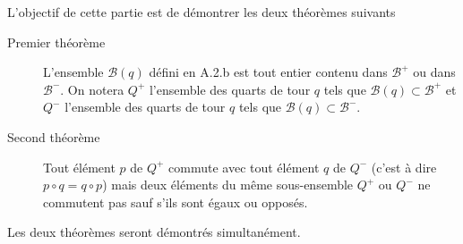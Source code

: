 L'objectif de cette partie est de démontrer les deux théorèmes suivants
\begin{description}
\item[Premier théorème] L'ensemble $\mathcal{B}(q)$ défini en A.2.b est tout entier contenu dans $\mathcal{B}^+$ ou dans $\mathcal{B}^-$.\newline
On notera $Q^+$ l'ensemble des quarts de tour $q$ tels que $\mathcal{B}(q)\subset \mathcal{B}^+$ et $Q^-$ l'ensemble des quarts de tour $q$ tels que $\mathcal{B}(q)\subset \mathcal{B}^-$.
\item[Second théorème] Tout élément $p$ de $Q^+$ commute avec tout élément $q$ de $Q^-$ (c'est à dire $p \circ q =q\circ p$) mais deux éléments du même sous-ensemble $Q^+$ ou $Q^-$ ne commutent pas sauf s'ils sont égaux ou opposés.
\end{description}
Les deux théorèmes seront démontrés simultanément.
